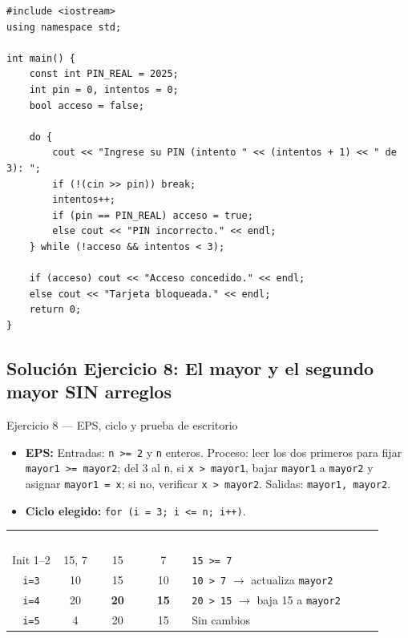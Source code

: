 \documentclass[11pt,letterpaper]{article}
\begin{document}
\begin{lstlisting}[style=cppmonitoria,caption={Solución Ejercicio 7: Acceso con máximo 3 intentos (C++)}]
#include <iostream>
using namespace std;

int main() {
    const int PIN_REAL = 2025;
    int pin = 0, intentos = 0;
    bool acceso = false;

    do {
        cout << "Ingrese su PIN (intento " << (intentos + 1) << " de 3): ";
        if (!(cin >> pin)) break;
        intentos++;
        if (pin == PIN_REAL) acceso = true;
        else cout << "PIN incorrecto." << endl;
    } while (!acceso && intentos < 3);

    if (acceso) cout << "Acceso concedido." << endl;
    else cout << "Tarjeta bloqueada." << endl;
    return 0;
}
\end{lstlisting}

\subsection{Solución Ejercicio 8: El mayor y el segundo mayor SIN arreglos}

\begin{solucion}{Ejercicio 8 --- EPS, ciclo y prueba de escritorio}
\begin{itemize}
  \item \textbf{EPS:} Entradas: \texttt{n >= 2} y \texttt{n} enteros. Proceso: leer los dos primeros para fijar \texttt{mayor1 >= mayor2}; del 3 al \texttt{n}, si \texttt{x > mayor1}, bajar \texttt{mayor1} a \texttt{mayor2} y asignar \texttt{mayor1 = x}; si no, verificar \texttt{x > mayor2}. Salidas: \texttt{mayor1, mayor2}.
  \item \textbf{Ciclo elegido:} \texttt{for (i = 3; i <= n; i++)}.
\end{itemize}
\begin{center}
\footnotesize
\renewcommand{\arraystretch}{1.15}
\begin{tabularx}{0.9\linewidth}{c c c c X}
\rowcolor{AzulMarino}
\textcolor{white}{\textbf{Paso}} & \textcolor{white}{\textbf{Dato}} & \textcolor{white}{\texttt{mayor1}} & \textcolor{white}{\texttt{mayor2}} & \textcolor{white}{\textbf{Comparación (\texttt{15, 7, 10, 20, 4})}} \\
Init 1--2 & 15, 7 & 15 & 7 & \texttt{15 >= 7} \\
\texttt{i=3} & 10 & 15 & 10 & \texttt{10 > 7} $\rightarrow$ actualiza \texttt{mayor2} \\
\texttt{i=4} & 20 & \textbf{20} & \textbf{15} & \texttt{20 > 15} $\rightarrow$ baja 15 a \texttt{mayor2} \\
\texttt{i=5} & 4 & 20 & 15 & Sin cambios \\
\bottomrule
\end{tabularx}
\end{center}
\end{solucion}
\end{document}
